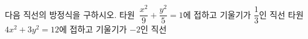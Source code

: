 다음 직선의 방정식을 구하시오.
 타원~$\dfrac{x^2}{9}+\dfrac{y^2}{5}=1$에 접하고 기울기가 $\dfrac{1}{3}$인 직선
 타원~$4x^2+3y^2=12$에 접하고 기울기가 $-2$인 직선
